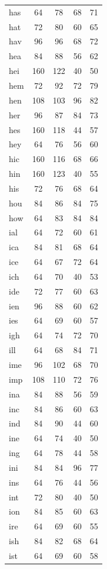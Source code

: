\documentclass[ms,electronic,twosidetoc,letterpaper,chaptercenter,parttop,lof,lot]{byumsphd}
\begin{document}
\begin{longtable}{| l | c c | c c |}
  has & 64 & 78 & 68 & 71 \\
  hat & 72 & 80 & 60 & 65 \\
  hav & 96 & 96 & 68 & 72 \\
  hea & 84 & 88 & 56 & 62 \\
  hei & 160 & 122 & 40 & 50 \\
  hem & 72 & 92 & 72 & 79 \\
  hen & 108 & 103 & 96 & 82 \\
  her & 96 & 87 & 84 & 73 \\
  hes & 160 & 118 & 44 & 57 \\
  hey & 64 & 76 & 56 & 60 \\
  hic & 160 & 116 & 68 & 66 \\
  hin & 160 & 123 & 40 & 55 \\
  his & 72 & 76 & 68 & 64 \\
  hou & 84 & 86 & 84 & 75 \\
  how & 64 & 83 & 84 & 84 \\
  ial & 64 & 72 & 60 & 61 \\
  ica & 84 & 81 & 68 & 64 \\
  ice & 64 & 67 & 72 & 64 \\
  ich & 64 & 70 & 40 & 53 \\
  ide & 72 & 77 & 60 & 63 \\
  ien & 96 & 88 & 60 & 62 \\
  ies & 64 & 69 & 60 & 57 \\
  igh & 64 & 74 & 72 & 70 \\
  ill & 64 & 68 & 84 & 71 \\
  ime & 96 & 102 & 68 & 70 \\
  imp & 108 & 110 & 72 & 76 \\
  ina & 84 & 88 & 56 & 59 \\
  inc & 84 & 86 & 60 & 63 \\
  ind & 84 & 90 & 44 & 60 \\
  ine & 64 & 74 & 40 & 50 \\
  ing & 64 & 78 & 44 & 58 \\
  ini & 84 & 84 & 96 & 77 \\
  ins & 64 & 76 & 44 & 56 \\
  int & 72 & 80 & 40 & 50 \\
  ion & 84 & 85 & 60 & 63 \\
  ire & 64 & 69 & 60 & 55 \\
  ish & 84 & 82 & 68 & 64 \\
  ist & 64 & 69 & 60 & 58 \\

\end{longtable}
\end{document}
